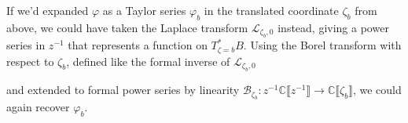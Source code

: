 \documentclass{article}
\newcommand{\maps}{\colon}
\newcommand{\C}{\mathbb{C}}
\newcommand{\laplace}{\mathcal{L}}
\newcommand{\borel}{\mathcal{B}}
\theoremstyle{definition}
\theoremstyle{plain}
\begin{document}
If we'd expanded $\varphi$ as a Taylor series ${\varphi}_b$ in the translated coordinate $\zeta_b$ from above, we could have taken the Laplace transform $\laplace_{\zeta_b,0}$ instead, giving a power series in $z^{-1}$ that represents a function on $T^*_{\zeta = b}B$. Using the Borel transform with respect to $\zeta_b$, defined like the formal inverse of $\laplace_{\zeta_b,0}$
\begin{center}
\end{center}
and extended to formal power series by linearity $\borel_{\zeta_b} \maps z^{-1} \C \llbracket z^{-1} \rrbracket  \to \C \llbracket \zeta_b \rrbracket$,
we could again recover ${\varphi}_b$. 

\end{document}
